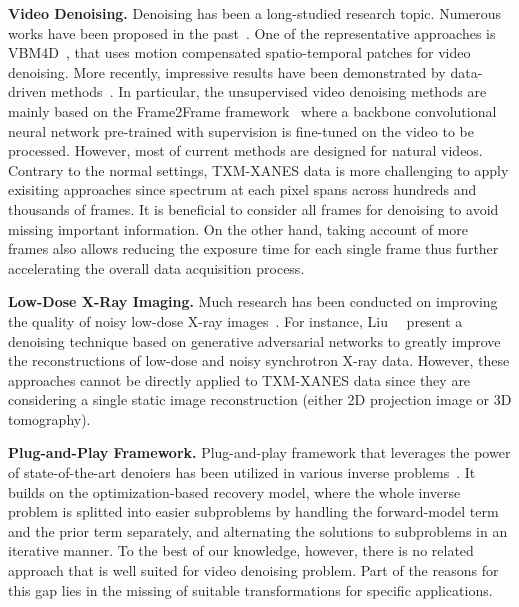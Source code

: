 \documentclass[10pt,twocolumn,letterpaper]{article}
\begin{document}
\textbf{Video Denoising.} Denoising has been a long-studied research topic. Numerous works have been proposed in the past~\cite{luisier2010sure,maggioni2012video,liu2010high,buades2016patch}. One of the representative approaches is VBM4D~\cite{maggioni2012video}, that uses motion compensated spatio-temporal patches for video denoising. More recently, impressive results have been demonstrated by data-driven methods~\cite{tassano2020fastdvdnet,ehret2019model,sheth2021unsupervised}. In particular, the unsupervised video denoising methods are mainly based on the Frame2Frame framework~\cite{ehret2019model} where a backbone convolutional neural network pre-trained with supervision is fine-tuned on the video to be processed. However, most of current methods are designed for natural videos. Contrary to the normal settings, TXM-XANES data is more challenging to apply exisiting approaches since spectrum at each pixel spans across hundreds and thousands of frames. It is beneficial to consider all frames for denoising to avoid missing important information. On the other hand, taking account of more frames also allows reducing the exposure time for each single frame thus further accelerating the overall data acquisition process.      

\textbf{Low-Dose X-Ray Imaging.} Much research has been conducted on improving the quality of noisy low-dose X-ray images~\cite{wang2020deep,yang2018low,liu2020tomogan}. For instance, Liu~\etal~\cite{liu2020tomogan} present a denoising technique based on generative adversarial networks to greatly improve the reconstructions of low-dose and noisy synchrotron X-ray data. However, these approaches cannot be directly applied to TXM-XANES data since they are considering a single static image reconstruction (either 2D projection image or 3D tomography). 

\textbf{Plug-and-Play Framework.} Plug-and-play framework that leverages the power of state-of-the-art denoiers has been utilized in various inverse problems~\cite{venkatakrishnan2013plug,chan2016plug,buzzard2018plug,sun2019online,zhang2021plug,ahmad2020plug,yuan2020plug}. It builds on the optimization-based recovery model, where the whole inverse problem is splitted into easier subproblems by handling the forward-model term and the prior term separately, and alternating the solutions to subproblems in an iterative manner. To the best of our knowledge, however, there is no related approach that is well suited for video denoising problem. Part of the reasons for this gap lies in the missing of suitable transformations for specific applications.
\end{document}
